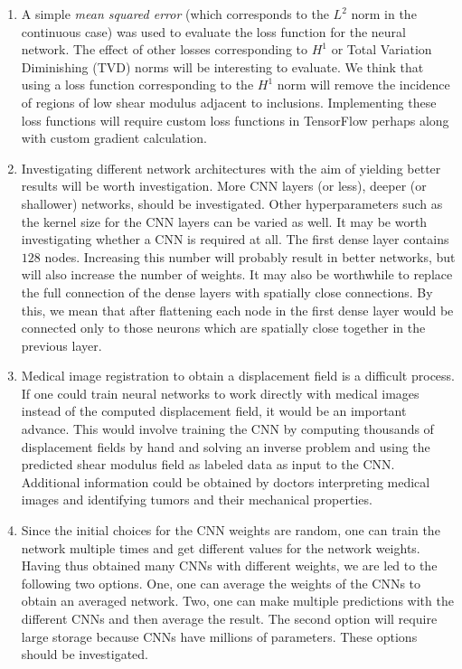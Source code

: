 \documentclass[12pt]{article}
\begin{document}
\begin{enumerate}
\item{A simple \textit{mean squared error} (which corresponds to the $L^2$ norm in the continuous case) was used to evaluate the loss function for the neural network. The effect of other losses corresponding to $H^1$ or Total Variation Diminishing (TVD) norms will be interesting to evaluate. We think that using a loss function corresponding to the $H^1$ norm will remove the incidence of regions of low shear modulus adjacent to inclusions. Implementing these loss functions will require custom loss functions in TensorFlow perhaps along with custom gradient calculation.}
\item{Investigating different network architectures with the aim of yielding better results will be worth investigation. More CNN layers (or less), deeper (or shallower) networks, should be investigated. Other hyperparameters such as the kernel size for the CNN layers can be varied as well. It may be worth investigating whether a CNN is required at all. The first dense layer contains $128$ nodes. Increasing this number will probably result in better networks, but will also increase the number of weights. It may also be worthwhile to replace the full connection of the dense layers with spatially close connections. By this, we mean that after flattening each node in the first dense layer would be connected only to those neurons which are spatially close together in the previous layer.}
\item{Medical image registration to obtain a displacement field is a difficult process. If one could train neural networks to work directly with medical images instead of the computed displacement field, it would be an important advance. This would involve training the CNN by computing thousands of displacement fields by hand and solving an inverse problem and using the predicted shear modulus field as labeled data as input to the CNN. Additional information could be obtained by doctors interpreting medical images and identifying tumors and their mechanical properties.}
\item{Since the initial choices for the CNN weights are random, one can train the network multiple times and get different values for the network weights. Having thus obtained many CNNs with different weights, we are led to the following two options. One, one can average the weights of the CNNs to obtain an averaged network. Two, one can make multiple predictions with the different CNNs and then average the result. The second option will require large storage because CNNs have millions of parameters. These options should be investigated.}

\end{enumerate}
\end{document}
